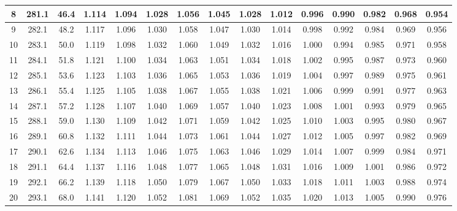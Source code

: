 \documentclass[12pt,a4paper,twoside]{article}
\begin{document}
\begin{center}
\begin{longtable}{ c c c | c c c c c c c c c c c c}
 8 & 281.1 & 46.4 & 1.114 & 1.094 & 1.028 & 1.056 & 1.045 & 1.028 & 1.012 & 0.996 & 0.990 & 0.982 & 0.968 & 0.954 \\ \hline   
 
 9 & 282.1 & 48.2 & 1.117 & 1.096 & 1.030 & 1.058 & 1.047 & 1.030 & 1.014 & 0.998 & 0.992 & 0.984 & 0.969 & 0.956 \\ \hline   
 
 10 & 283.1 & 50.0 & 1.119 & 1.098 & 1.032 & 1.060 & 1.049 & 1.032 & 1.016 & 1.000 & 0.994 & 0.985 & 0.971 & 0.958 \\ \hline   
 
 11 & 284.1 & 51.8 & 1.121 & 1.100 & 1.034 & 1.063 & 1.051 & 1.034 & 1.018 & 1.002 & 0.995 & 0.987 & 0.973 & 0.960 \\ \hline   
 
 12 & 285.1 & 53.6 & 1.123 & 1.103 & 1.036 & 1.065 & 1.053 & 1.036 & 1.019 & 1.004 & 0.997 & 0.989 & 0.975 & 0.961 \\ \hline   
 
 13 & 286.1 & 55.4 & 1.125 & 1.105 & 1.038 & 1.067 & 1.055 & 1.038 & 1.021 & 1.006 & 0.999 & 0.991 & 0.977 & 0.963 \\ \hline   
 
 14 & 287.1 & 57.2 & 1.128 & 1.107 & 1.040 & 1.069 & 1.057 & 1.040 & 1.023 & 1.008 & 1.001 & 0.993 & 0.979 & 0.965 \\ \hline   
 
 15 & 288.1 & 59.0 & 1.130 & 1.109 & 1.042 & 1.071 & 1.059 & 1.042 & 1.025 & 1.010 & 1.003 & 0.995 & 0.980 & 0.967 \\ \hline   
 
 16 & 289.1 & 60.8 & 1.132 & 1.111 & 1.044 & 1.073 & 1.061 & 1.044 & 1.027 & 1.012 & 1.005 & 0.997 & 0.982 & 0.969 \\ \hline   
 
 17 & 290.1 & 62.6 & 1.134 & 1.113 & 1.046 & 1.075 & 1.063 & 1.046 & 1.029 & 1.014 & 1.007 & 0.999 & 0.984 & 0.971 \\ \hline   
 
 18 & 291.1 & 64.4 & 1.137 & 1.116 & 1.048 & 1.077 & 1.065 & 1.048 & 1.031 & 1.016 & 1.009 & 1.001 & 0.986 & 0.972 \\ \hline   
 
 19 & 292.1 & 66.2 & 1.139 & 1.118 & 1.050 & 1.079 & 1.067 & 1.050 & 1.033 & 1.018 & 1.011 & 1.003 & 0.988 & 0.974 \\ \hline   
 
 20 & 293.1 & 68.0 & 1.141 & 1.120 & 1.052 & 1.081 & 1.069 & 1.052 & 1.035 & 1.020 & 1.013 & 1.005 & 0.990 & 0.976 \\ \hline   
 

\end{longtable}
\end{center}
\end{document}
